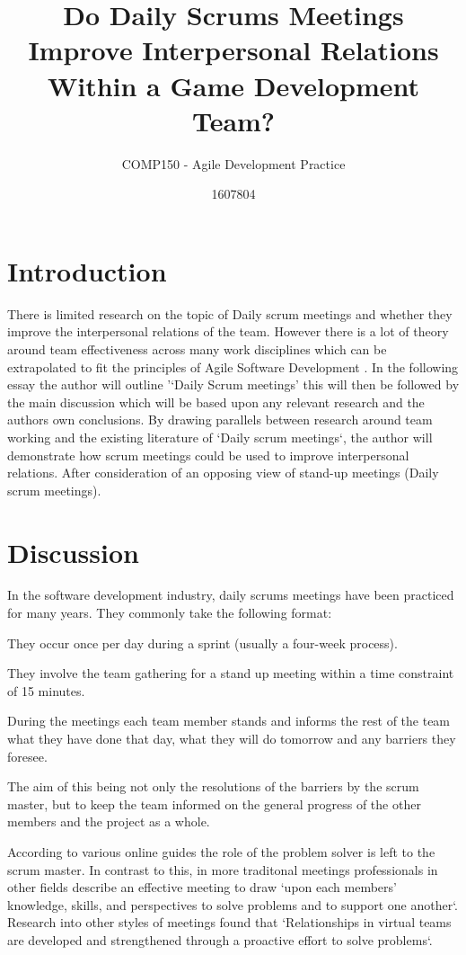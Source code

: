 \documentclass{scrartcl}
\title{Do Daily Scrums Meetings Improve Interpersonal Relations Within a Game Development Team?}
\subtitle{COMP150 - Agile Development Practice}
\author{1607804}
\begin{document}
\maketitle


\section{Introduction}
There is limited research on the topic of Daily scrum meetings and whether they improve the interpersonal relations of the team. However there is a lot of theory around team effectiveness across many work disciplines which can be extrapolated to fit the principles of Agile Software Development \cite{Agile}. In the following essay the author will outline '‘Daily Scrum meetings' this will then be followed by the main discussion which will be based upon any relevant research and the authors own conclusions. By drawing parallels between research around team working and the existing literature of ‘Daily scrum meetings`, the author will demonstrate how scrum meetings could be used to improve interpersonal relations. After consideration of an opposing view of stand-up meetings (Daily scrum meetings)\cite{badstand}. 


\section{Discussion}
In the software development industry, daily scrums meetings have been practiced for many years. They commonly take the following format:
\begin{description}
\item They occur once per day during a sprint (usually a four-week process). 
\item They involve the team gathering for a stand up meeting within a time constraint of 15 minutes. 
\item During the meetings each team member stands and informs the rest of the team what they have done that day, what they will do tomorrow and any barriers they foresee.
\item The aim of this being not only the resolutions of the barriers by the scrum master, but to keep the team informed on the general progress of the other members and the project as a whole. 
\end{description}


According to various online guides\cite{DailyScrum, EffectiveScrum} the role of the problem solver is left to the scrum master. In contrast to this, in more traditonal meetings professionals in other fields describe an effective meeting to draw `upon each members' knowledge, skills, and perspectives to solve problems and to support one another`\cite{LeadershipLesson}. Research into other styles of meetings found that `Relationships in virtual teams are developed and strengthened through a proactive effort to solve problems`\cite[p. 559]{tavvcar2005skills}. 
\end{document}
